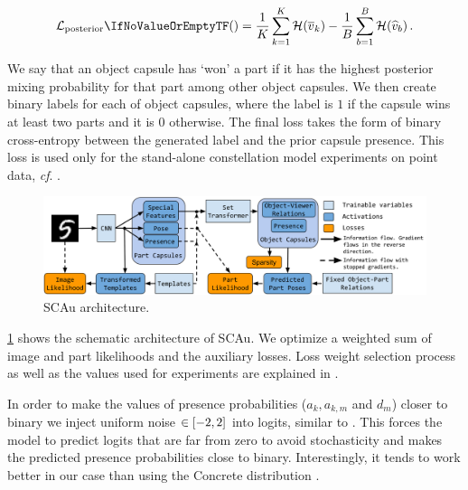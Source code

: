 \begin{description}[leftmargin=\parindent]
\begin{equation}
        \loss[\mathrm{posterior}]{} = \frac{1}{K} \sum_{k=1}^K \mathcal{H}(\overline{v}_k) - \frac{1}{B} \sum_{b=1}^B \mathcal{H}(\widehat{v}_b)\,. \label{eq:posterior_sparsity}
    \end{equation}
% 
\item[Every active object capsule should explain at least two parts]
    We say that an object capsule has `won' a part if it has the highest posterior mixing probability for that part among other object capsules.
    We then create binary labels for each of object capsules, where the label is $1$ if the capsule wins at least two parts and it is $0$ otherwise.
    The final loss takes the form of binary cross-entropy between the generated label and the prior capsule presence. This loss is used only for the stand-alone constellation model experiments on point data, \textit{cf}. .
% 
\end{description}
\begin{figure}
    \centering
    \includegraphics[width=\linewidth]{figures/SCA/sca_architecture_v3}
    \caption{\gls{SCAu} architecture.}
    \label{fig:sca_arch}
\end{figure}
\cref{fig:sca_arch} shows the schematic architecture of \gls{SCAu}. We optimize a weighted sum of image and part likelihoods and the auxiliary losses. 
Loss weight selection process as well as the values used for experiments are explained in .

In order to make the values of presence probabilities ($a_k, a_{k,m}$ and $d_m$) closer to binary we inject uniform noise $\in {\left[-2, 2\right]}$ into logits, similar to \cite{Tieleman2014thesis}.
This forces the model to predict logits that are far from zero to avoid stochasticity and makes the predicted presence probabilities close to binary.
Interestingly, it tends to work better in our case than using the Concrete distribution \citep{Maddison2017concrete}.